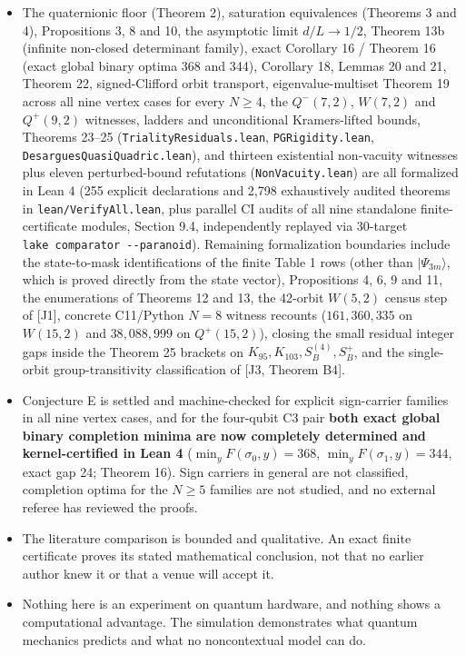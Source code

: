 \documentclass[11pt,a4paper]{article}
\begin{document}
\begin{itemize}
  and \nolinkurl{tracks/spectral-bounds/scripts/exact_degrees_n4_n5.py} independently reproduce the 42-orbit census and certify all 42
  orbits in exact integer arithmetic with zero floating point. Moving the 42-orbit census and all 42
  integer certificates themselves into the Lean kernel remains an open formalization target (while
  \(d(Q^+(7,2)) = 315\) is already fully kernel-proved).
\item
  The quaternionic floor (Theorem 2), saturation equivalences (Theorems 3 and 4), Propositions 3, 8 and
  10, the asymptotic limit \(d/L\to1/2\), Theorem 13b (infinite non-closed determinant family), exact
  Corollary 16 / Theorem 16\textquotesingle\textquotesingle{} (exact global binary optima 368 and 344), Corollary 18, Lemmas 20 and 21,
  Theorem 22, signed-Clifford orbit transport, eigenvalue-multiset Theorem 19 across all nine vertex
  cases for every \(N\ge4\), the \(Q^-(7,2)\), \(W(7,2)\) and \(Q^+(9,2)\) witnesses, ladders and unconditional
  Kramers-lifted bounds, Theorems 23--25 (\nolinkurl{TrialityResiduals.lean}, \nolinkurl{PGRigidity.lean}, \nolinkurl{DesarguesQuasiQuadric.lean}), and thirteen existential non-vacuity witnesses plus eleven perturbed-bound refutations (\texttt{NonVacuity.lean}) are all formalized
  in Lean 4 (255 explicit declarations and 2,798 exhaustively audited theorems in \nolinkurl{lean/VerifyAll.lean}, plus parallel CI audits of all nine standalone finite-certificate modules, Section 9.4, independently
  replayed via 30-target \texttt{lake\ comparator\ -\/-paranoid}). Remaining formalization boundaries include the
  state-to-mask identifications of the finite Table 1 rows (other than \(|\Psi_{3m}\rangle\), which is
  proved directly from the state vector), Propositions 4, 6, 9 and 11, the enumerations of Theorems 12
  and 13, the 42-orbit \(W(5,2)\) census step of {[}J1{]}, concrete C11/Python \(N=8\) witness recounts
  (\(161{,}360{,}335\) on \(W(15,2)\) and \(38{,}088{,}999\) on \(Q^+(15,2)\)), closing the small residual integer
  gaps inside the Theorem 25 brackets on \(K_{95}, K_{103}, S_B^{(4)}, S_B^+\), and the single-orbit group-transitivity
  classification of {[}J3, Theorem B4{]}.
\item
  Conjecture E is settled and machine-checked for explicit sign-carrier families in all nine vertex
  cases, and for the four-qubit C3 pair \textbf{both exact global binary completion minima are now completely
  determined and kernel-certified in Lean 4} (\(\min_y F(\sigma_0,y) = 368\), \(\min_y F(\sigma_1,y) = 344\),
  exact gap 24; Theorem 16\textquotesingle\textquotesingle). Sign carriers in general are not classified, completion optima for the
  \(N \ge 5\) families are not studied, and no external referee has reviewed the proofs.
\item
  The literature comparison is bounded and qualitative. An exact finite certificate proves its
  stated mathematical conclusion, not that no earlier author knew it or that a venue will accept it.
\item
  Nothing here is an experiment on quantum hardware, and nothing shows a computational advantage.
  The simulation demonstrates what quantum mechanics predicts and what no noncontextual model can do.
\end{itemize}
\end{document}
